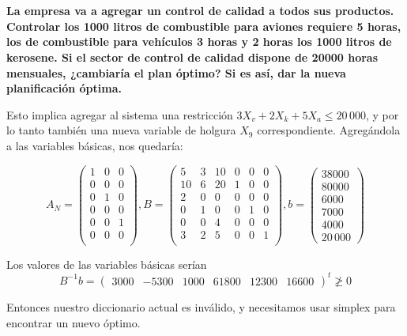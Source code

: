 \documentclass[10pt,a4paper]{article}
\begin{document}
\section{} %

\textbf{La empresa va a agregar un control de calidad a todos sus productos. Controlar los 1000 litros de combustible para aviones requiere 5 horas, los de combustible para vehículos 3 horas y 2 horas los 1000 litros de kerosene. Si el sector de control de calidad dispone de 20000 horas mensuales, ¿cambiaría el plan óptimo? Si es así, dar la nueva planificación óptima.}

\vspace{5mm}

Esto implica agregar al sistema una restricción $3X_v + 2X_k + 5X_a \leq 20\,000$, y por lo tanto también una nueva variable de holgura $X_9$ correspondiente. Agregándola a las variables básicas, nos quedaría:

\[
	A_N = \begin{pmatrix}
		1 & 0 & 0 \\
		0 & 0 & 0 \\
		0 & 1 & 0 \\
		0 & 0 & 0 \\
		0 & 0 & 1 \\
		0 & 0 & 0 \\
	\end{pmatrix},
	B = \begin{pmatrix}
		5  & 3 & 10 & 0 & 0 & 0\\
		10 & 6 & 20 & 1 & 0 & 0\\
		2  & 0 & 0  & 0 & 0 & 0\\
		0  & 1 & 0  & 0 & 1 & 0\\
		0  & 0 & 4  & 0 & 0 & 0\\
		3  & 2 & 5  & 0 & 0 & 1\\
	\end{pmatrix},
	b = \begin{pmatrix}
		38000 \\
		80000 \\
		6000 \\
		7000 \\
		4000 \\
		20\,000
	\end{pmatrix}
\]

Los valores de las variables básicas serían
\[
	B^{-1} b = \begin{pmatrix}
		3000 & -5300 & 1000 & 61800 & 12300 & 16600
	\end{pmatrix}^t \ngeq 0
\]

Entonces nuestro diccionario actual es inválido, y necesitamos usar simplex para encontrar un nuevo óptimo.
\end{document}
